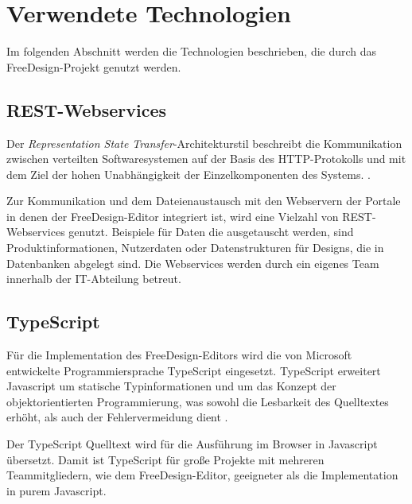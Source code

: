 \section{Verwendete Technologien}
Im folgenden Abschnitt werden die Technologien beschrieben, die durch das FreeDesign-Projekt genutzt werden. 

\subsection{REST-Webservices}
Der \emph{Representation State Transfer}-Architekturstil beschreibt die Kommunikation zwischen verteilten Softwaresystemen auf der Basis des HTTP-Protokolls und mit dem Ziel der hohen Unabhängigkeit der Einzelkomponenten des Systems. \autocite[vgl.][105-106]{Fielding2000}.

Zur Kommunikation und dem Dateienaustausch mit den Webservern der Portale in denen der FreeDesign-Editor integriert ist, wird eine Vielzahl von REST-Webservices genutzt. 
Beispiele für Daten die ausgetauscht werden, sind Produktinformationen, Nutzerdaten oder Datenstrukturen für Designs, die in Datenbanken abgelegt sind.
Die Webservices werden durch ein eigenes Team innerhalb der IT-Abteilung betreut.  

\subsection{TypeScript}
Für die Implementation des FreeDesign-Editors wird die von Microsoft entwickelte Programmiersprache TypeScript eingesetzt. TypeScript erweitert Javascript um statische Typinformationen und um das Konzept der objektorientierten Programmierung, was sowohl die Lesbarkeit des Quelltextes erhöht, als auch der Fehlervermeidung dient \autocite[vgl.][S. 111]{Zeigermann2014}. 

Der TypeScript Quelltext wird für die Ausführung im Browser in Javascript übersetzt. Damit ist TypeScript für große Projekte mit mehreren Teammitgliedern, wie dem FreeDesign-Editor, geeigneter als die Implementation in purem Javascript.

